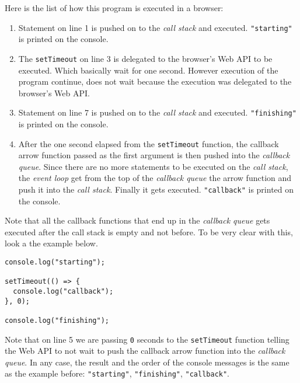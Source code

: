 \documentclass[a4paper, oneside, titlepage, 12pt]{book}
\begin{document}
Here is the list of how this program is executed in a browser:
\begin{enumerate}
\item Statement on line 1 is pushed on to the \textit{call stack} and executed. \texttt{"starting"} is printed on the console. 
\item The \texttt{setTimeout} on line 3 is delegated to the browser's Web API to be executed. Which basically wait for one second. However execution of the program continue, does not wait because the execution was delegated to the browser's Web API.
\item Statement on line 7 is pushed on to the \textit{call stack} and executed. \texttt{"finishing"} is printed on the console.
\item After the one second elapsed from the \texttt{setTimeout} function, the callback arrow function passed as the first argument is then pushed into the \textit{callback queue}. Since there are no more statements to be executed on the \textit{call stack}, the \textit{event loop} get from the top of the \textit{callback queue} the arrow function and push it into the \textit{call stack}. Finally it gets executed. \texttt{"callback"} is printed on the console.
\end{enumerate}

Note that all the callback functions that end up in the \textit{callback queue} gets executed after the call stack is empty and not before. To be very clear with this, look a the example below.

\begin{verbatim}
console.log("starting");

setTimeout(() => {
  console.log("callback");
}, 0);

console.log("finishing");
\end{verbatim}

Note that on line 5 we are passing \texttt{0} seconds to the \texttt{setTimeout} function telling the Web API to not wait to push the callback arrow function into the \textit{callback queue}. In any case, the result and the order of the console messages is the same as the example before: \texttt{"starting"}, \texttt{"finishing"}, \texttt{"callback"}.
\end{document}
